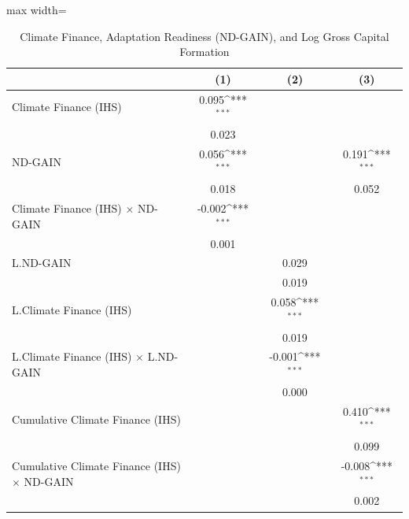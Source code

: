 \begin{table}[htbp]\centering {} \caption{Climate Finance, Adaptation Readiness (ND-GAIN), and Log Gross Capital Formation} \begin{adjustbox}{max width=\textwidth} \begin{tabular}{l*{3}{c}} \toprule
                    &\multicolumn{1}{c}{(1)}         &\multicolumn{1}{c}{(2)}         &\multicolumn{1}{c}{(3)}         \\
\midrule
Climate Finance (IHS)&       0.095\sym{***}&                     &                     \\
                    &       0.023         &                     &                     \\
ND-GAIN             &       0.056\sym{***}&                     &       0.191\sym{***}\\
                    &       0.018         &                     &       0.052         \\
Climate Finance (IHS) $\times$ ND-GAIN&      -0.002\sym{***}&                     &                     \\
                    &       0.001         &                     &                     \\
L.ND-GAIN           &                     &       0.029         &                     \\
                    &                     &       0.019         &                     \\
L.Climate Finance (IHS)&                     &       0.058\sym{***}&                     \\
                    &                     &       0.019         &                     \\
L.Climate Finance (IHS) $\times$ L.ND-GAIN&                     &      -0.001\sym{***}&                     \\
                    &                     &       0.000         &                     \\
Cumulative Climate Finance (IHS)&                     &                     &       0.410\sym{***}\\
                    &                     &                     &       0.099         \\
Cumulative Climate Finance (IHS) $\times$ ND-GAIN&                     &                     &      -0.008\sym{***}\\
                    &                     &                     &       0.002         \\

\end{tabular}
\end{adjustbox}
\end{table}

